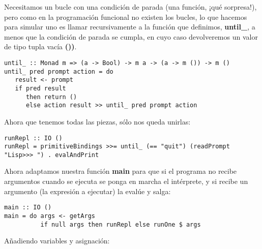Necesitamos un bucle con una condici\'on de parada (una funci\'on, \mbox{¡}qu\'e sorpresa!), pero como en la programaci\'on funcional no existen los bucles, lo que hacemos para simular uno es llamar recursivamente a la funci\'on que definimos, \textbf{until\_}, a menos que la condici\'on de parada se cumpla, en cuyo caso devolveremos un valor de tipo tupla vac\'ia \textbf{())}.\\

\begin{minipage}{\linewidth}
\begin{footnotesize}
\begin{lstlisting}[frame=single]
until_ :: Monad m => (a -> Bool) -> m a -> (a -> m ()) -> m ()
until_ pred prompt action = do 
   result <- prompt
   if pred result 
      then return ()
      else action result >> until_ pred prompt action
\end{lstlisting}
\end{footnotesize}
\end{minipage}

Ahora que tenemos todas las piezas, s\'olo nos queda unirlas:\\

\begin{minipage}{\linewidth}
\begin{tiny}
\begin{lstlisting}[frame=single]
runRepl :: IO ()
runRepl = primitiveBindings >>= until_ (== "quit") (readPrompt "Lisp>>> ") . evalAndPrint
\end{lstlisting}
\end{tiny}
\end{minipage}

Ahora adaptamos nuestra funci\'on \textbf{main} para que si el programa no recibe argumentos cuando se ejecuta se ponga en marcha el int\'erprete, y si recibe un argumento (la expresi\'on a ejecutar) la eval\'ue y salga:\\

\begin{minipage}{\linewidth}
\begin{footnotesize}
\begin{lstlisting}[frame=single]
main :: IO ()
main = do args <- getArgs
          if null args then runRepl else runOne $ args
\end{lstlisting}
\end{footnotesize}
\end{minipage}

A\~{n}adiendo variables y asignaci\'on:\\

